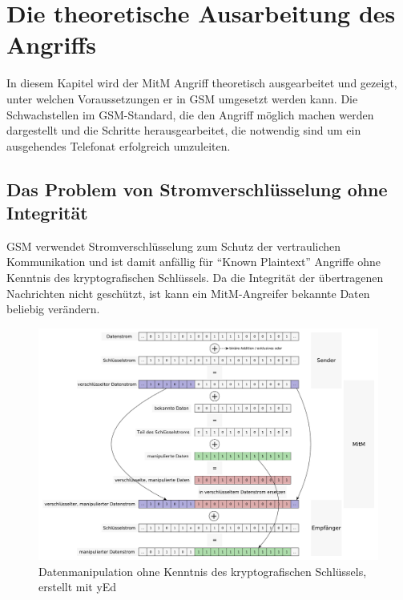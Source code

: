 \chapter{Die theoretische Ausarbeitung des Angriffs} \label{hdl:theroetical-attack}

In diesem Kapitel wird der \ac{MitM} Angriff theoretisch ausgearbeitet und gezeigt, unter welchen Voraussetzungen er in \ac{GSM} umgesetzt werden kann. Die Schwachstellen im \ac{GSM}-Standard, die den Angriff möglich machen werden dargestellt und die Schritte herausgearbeitet, die notwendig sind um ein ausgehendes Telefonat erfolgreich umzuleiten.

\section{Das Problem von Stromverschlüsselung ohne Integrität} \label{hdl:einleitung_verschlue_ohne_int}

\ac{GSM} verwendet Stromverschlüsselung zum Schutz der vertraulichen Kommunikation und ist damit anfällig für "`Known Plaintext"' Angriffe ohne Kenntnis des kryptografischen Schlüssels. Da die Integrität der übertragenen Nachrichten nicht geschützt, ist kann ein \ac{MitM}-Angreifer bekannte Daten beliebig verändern.

\begin{figure}[H]
	\centering \includegraphics[width=1.0\linewidth]{figures/partially_known_plaintext_manipulation.pdf}
	\caption[Datenmanipulation ohne Kenntnis des kryptografischen Schlüssels]{Datenmanipulation ohne Kenntnis des kryptografischen Schlüssels, erstellt mit yEd} \label{fig:partially-known-plaintext-manipulation}
\end{figure}

